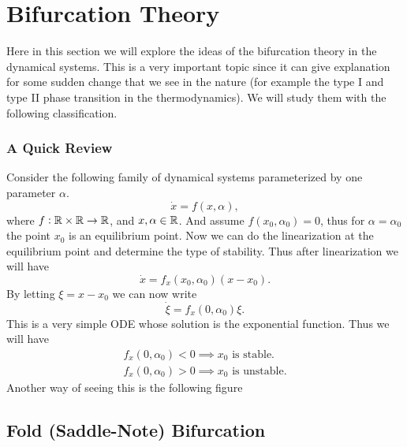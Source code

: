 \section{Bifurcation Theory}

Here in this section we will explore the ideas of the bifurcation theory in the dynamical systems. This is a very important topic since it can give explanation for some sudden change that we see in the nature (for example the type I and type II phase transition in the thermodynamics). We will study them with the following classification.

\subsubsection{A Quick Review}
Consider the following family of dynamical systems parameterized by one parameter $\alpha$. 
\[ \dot{x} = f(x,\alpha), \]
where $f:\mathbb{R} \times \mathbb{R} \to \mathbb{R}$, and $x,\alpha \in \mathbb{R}$. And assume $f(x_0,\alpha_0)=0$, thus for $\alpha=\alpha_0$ the point $x_0$ is an equilibrium point. Now we can do the linearization at the equilibrium point and determine the type of stability. Thus after linearization we will have
\[ \dot{x} = f_x(x_0,\alpha_0) (x-x_0). \]
By letting $\xi = x - x_0$ we can now write
\[ \dot{\xi} = f_x(0,\alpha_0) \xi. \]
This is a very simple ODE whose solution is the exponential function. Thus we will have
\begin{align*}
	f_x(0,\alpha_0) < 0 \implies \text{$x_0$ is stable}.\\
	f_x(0,\alpha_0) > 0 \implies \text{$x_0$ is unstable}.
\end{align*}
Another way of seeing this is the following figure



\subsection{Fold (Saddle-Note) Bifurcation}
